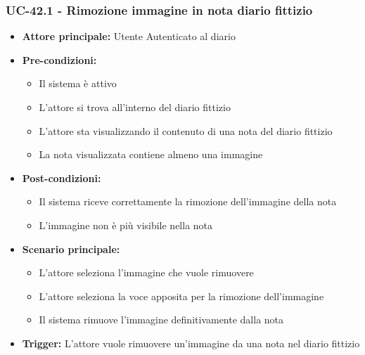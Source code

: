 \documentclass[a4paper,12pt]{article}
\begin{document}
\subsubsection{UC-42.1 - Rimozione immagine in nota diario fittizio} \label{subsec:UC-42.1}
\begin{itemize}
    \item \textbf{Attore principale:} Utente Autenticato al diario
    \item \textbf{Pre-condizioni:}
    \begin{itemize}
        \item Il sistema è attivo
        \item L'attore si trova all'interno del diario fittizio
        \item L'attore sta visualizzando il contenuto di una nota del diario fittizio
        \item La nota visualizzata contiene almeno una immagine
    \end{itemize}
    \item \textbf{Post-condizioni:}
    \begin{itemize}
        \item Il sistema riceve correttamente la rimozione dell'immagine della nota
        \item L'immagine non è più visibile nella nota
    \end{itemize}
    \item \textbf{Scenario principale:}
    \begin{itemize}
        \item L'attore seleziona l'immagine che vuole rimuovere
        \item L'attore seleziona la voce apposita per la rimozione dell'immagine
        \item Il sistema rimuove l'immagine definitivamente dalla nota
    \end{itemize}
    \item \textbf{Trigger:} L'attore vuole rimuovere un'immagine da una nota nel diario fittizio
\end{itemize}
\end{document}
